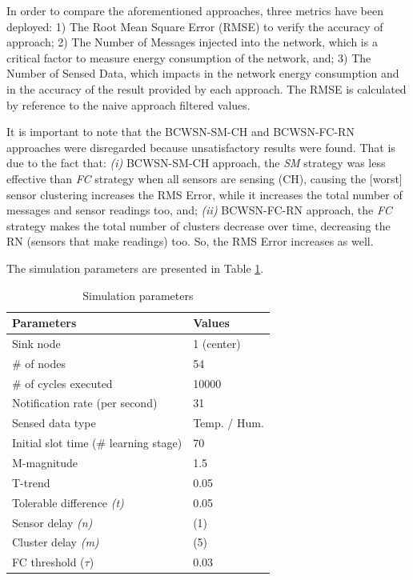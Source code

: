 \documentclass{acm_proc_article-sp}
\begin{document}
In order to compare the aforementioned approaches, three metrics have been
deployed: 1) The Root Mean Square Error (RMSE) to verify the accuracy of
approach; 2) The Number of Messages injected into the network, which is a
critical factor to measure energy consumption of the network, and; 3) The
Number of Sensed Data, which impacts in the network energy consumption and in
the accuracy of the result provided by each approach. The RMSE is calculated by
reference to the naive approach filtered values.

It is important to note that the BCWSN-SM-CH and BCWSN-FC-RN approaches were
disregarded because unsatisfactory results were found. That is due to the fact
that: {\it
  (i)} BCWSN-SM-CH approach, the \textit{SM} strategy was less effective than
  \textit{FC} strategy when all sensors are sensing (CH), causing the [worst]
  sensor clustering increases the RMS Error, while it increases the total number of
  messages and sensor readings too, and; {\it
  (ii)} BCWSN-FC-RN approach, the \textit{FC} strategy makes the total number of
  clusters decrease over time, decreasing the RN (sensors that make readings)
  too. So, the RMS Error increases as well.

The simulation parameters are presented in Table \ref{tab:parameters}.

\begin{table}[h!]
\caption{Simulation parameters}
\label{tab:parameters}
\begin{center}
\begin{tabular}{|l||l|}
\hline
Parameters &Values\\
\hline\hline
Sink node &1 (center) \\
\hline
\# of nodes &54 \\
\hline
\# of cycles executed &10000 \\
\hline
Notification rate (per second) &31 \\
\hline
Sensed data type &Temp. / Hum. \\
\hline
Initial slot time (\# learning stage) &70 \\
\hline
M-magnitude &1.5 \\
\hline
T-trend &0.05 \\
\hline
Tolerable difference {\it(t)} &0.05 \\
\hline
Sensor delay {\it(n)} &(1) \\
\hline
Cluster delay {\it(m)} &(5) \\
\hline
FC threshold ($\tau$) &0.03 \\
\hline
\end{tabular}
\end{center}
\end{table}
\end{document}
